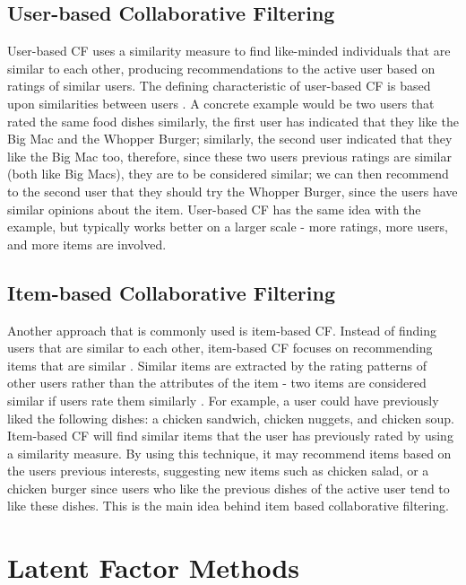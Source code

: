 \subsection{User-based Collaborative Filtering}

User-based CF uses a similarity measure to find like-minded individuals that are similar to each other, producing recommendations to the active user based on ratings of similar users. The defining characteristic of user-based CF is based upon similarities between users \cite{mahoutaction}. A concrete example would be two users that rated the same food dishes similarly, the first user has indicated that they like the Big Mac and the Whopper Burger; similarly, the second user indicated that they like the Big Mac too, therefore, since these two users previous ratings are similar (both like Big Macs), they are to be considered similar; we can then recommend to the second user that they should try the Whopper Burger, since the users have similar opinions about the item. User-based CF has the same idea with the example, but typically works better on a larger scale - more ratings, more users, and more items are involved. 


\subsection{Item-based Collaborative Filtering}

Another approach that is commonly used is item-based CF. Instead of finding users that are similar to each other, item-based CF focuses on recommending items that are similar \cite{mahoutaction}. Similar items are extracted by the rating patterns of other users rather than the attributes of the item - two items are considered similar if users rate them similarly \cite{schafer2007collaborative}. For example, a user could have previously liked the following dishes: a chicken sandwich, chicken nuggets, and chicken soup. Item-based CF will find similar items that the user has previously rated by using a similarity measure. By using this technique, it may recommend items based on the users previous interests, suggesting new items such as chicken salad, or a chicken burger since users who like the previous dishes of the active user tend to like these dishes. This is the main idea behind item based collaborative filtering. 


\section{Latent Factor Methods}


